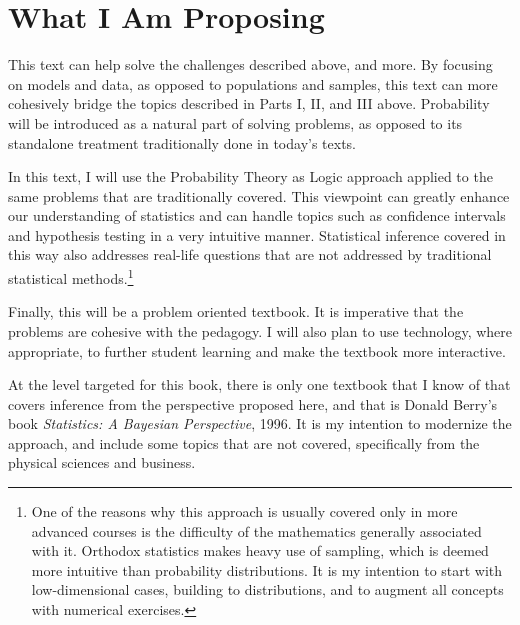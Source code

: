 \section*{What I Am Proposing}

This text can help solve the challenges described above, and more.  By focusing on models and data, as opposed to populations and samples, this text can more cohesively bridge the topics described in Parts I, II, and III above.  Probability will be introduced as a natural part of solving problems, as opposed to its standalone treatment traditionally done in today's texts. 

In this text, I will use the Probability Theory as Logic approach applied to the same problems that are traditionally covered.  This viewpoint can greatly enhance our understanding of statistics and can handle topics such as confidence intervals and hypothesis testing in a very intuitive manner.  Statistical inference covered in this way also addresses real-life questions that are not addressed by traditional statistical methods.\footnote{One of the reasons why this approach is usually covered only in more advanced courses is the difficulty of the mathematics generally associated with it.  Orthodox statistics makes heavy use of sampling, which is deemed more intuitive than probability distributions.  It is my intention to start with low-dimensional cases, building to distributions, and to augment all concepts with numerical exercises. }

Finally, this will be a problem oriented textbook.  It is imperative that the problems are cohesive with the pedagogy.  I will also plan to use technology, where appropriate, to further student learning and make the textbook more interactive.  

At the level targeted for this book, there is only one textbook that I know of that covers inference from the perspective proposed here, and that is Donald Berry's book {\em Statistics: A Bayesian Perspective}, 1996.  It is my intention to modernize the approach, and include some topics that are not covered, specifically from the physical sciences and business.

